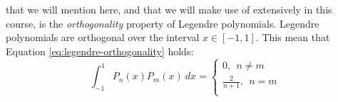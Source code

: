  that we will mention here, and that we will make use of extensively in this course, is the \emph{orthogonality} property of Legendre polynomials.
Legendre polynomials are orthogonal over the interval $x \in [-1,1]$.  This mean that Equation \ref{eq:legendre-orthogonality} holds:
\begin{equation}
\int_{-1}^{1} P_n(x) P_m(x) \ dx = 
\begin{cases}
0, \ \ n \ne m \\
\frac{2}{n+1}, \ \ n = m \\
\end{cases}
\label{eq:legendre-orthogonality}
\end{equation}

